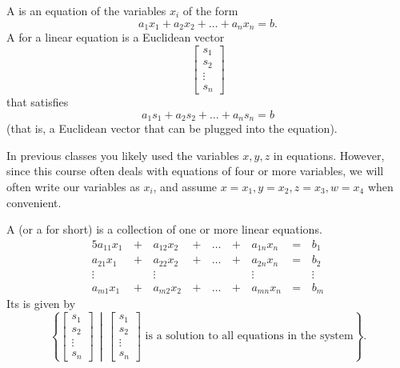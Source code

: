 
\begin{applicationActivities}

\begin{definition}
A  is an equation of the variables \(x_i\) of the form
\[
a_1x_1+a_2x_2+\dots+a_nx_n=b
.\]
A  for a linear equation is a Euclidean vector
\[
  \begin{bmatrix}
    s_1 \\
    s_2 \\
    \vdots \\
    s_n
  \end{bmatrix}
\]
that satisfies
\[
a_1s_1+a_2s_2+\dots+a_ns_n=b
\]
(that is, a Euclidean vector that can be plugged into the equation).
\end{definition}



\begin{remark}
In previous classes you likely used the variables \(x,y,z\) in equations.
However, since this course often deals with equations of four or more
variables, we will often write our variables as \(x_i\), and assume
\(x=x_1,y=x_2,z=x_3,w=x_4\) when convenient.
\end{remark}

\begin{definition}
A  (or a  for short)
is a collection of one or more linear equations.
  \begin{alignat*}{5}
    a_{11}x_1 &\,+\,& a_{12}x_2 &\,+\,& \dots  &\,+\,& a_{1n}x_n &\,=\,& b_1 \\
    a_{21}x_1 &\,+\,& a_{22}x_2 &\,+\,& \dots  &\,+\,& a_{2n}x_n &\,=\,& b_2 \\
     \vdots&  &\vdots&   &&  &\vdots&&\vdots  \\
    a_{m1}x_1 &\,+\,& a_{m2}x_2 &\,+\,& \dots  &\,+\,& a_{mn}x_n &\,=\,& b_m
  \end{alignat*}
Its  is given by
\[
  \left\{
    \begin{bmatrix}
      s_1 \\
      s_2 \\
      \vdots \\
      s_n
    \end{bmatrix}
  \,\middle|\,
    \begin{bmatrix}
      s_1 \\
      s_2 \\
      \vdots \\
      s_n
    \end{bmatrix}
    \text{ is a solution to all equations in the system}
  \right\}
.\]
\end{definition}


\end{applicationActivities}
